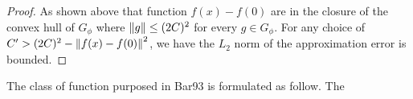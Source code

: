 \begin{proof}
As shown above that function $f(x) - f(0)$ are in the closure of the convex hull of $G_{\phi}$ where
$\left\| g \right\| \leq (2C)^2$ for every $g \in G_{\phi}$. 
For any choice of $C' > (2C)^2 - \left\| f(x) - f(0) \right\|^2$,
we have the $L_2$ norm of the approximation error is bounded.




\end{proof}

\newpage



The class of function purposed in Bar93 is formulated as follow. The    


